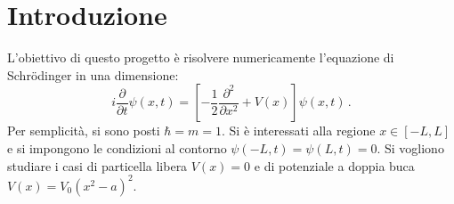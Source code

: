 \documentclass[a4paper, titlepage]{article}
\numberwithin{equation}{section}
\begin{document}

\newcommand{\sch}[0]{Schrödinger }

\section{Introduzione}
L'obiettivo di questo progetto è risolvere numericamente l'equazione di Schrödinger in una dimensione:
\begin{equation}
    i\frac{\partial}{\partial t}\psi(x,t) = \left[-\frac{1}{2}\frac{\partial^2}{\partial x^2} + V(x)\right]\psi(x,t)\, .
    \label{eq:sch}
\end{equation}
Per semplicità, si sono posti $\hbar = m = 1$. Si è interessati alla regione $x \in [-L,L]$ e si impongono le condizioni al contorno $\psi(-L,t) = \psi(L,t) = 0$. Si vogliono studiare i casi di particella libera $V(x) = 0$ e di potenziale a doppia buca $V(x) = V_0(x^2-a)^2$.
\end{document}
